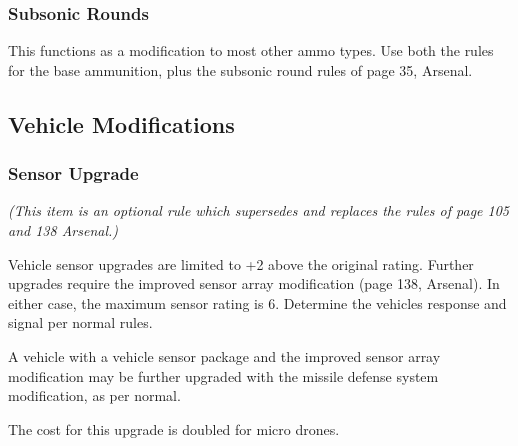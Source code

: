 \documentclass{article}
\begin{document}
\subsubsection*{Subsonic Rounds}

  This functions as a modification to most other ammo types.  Use both the rules for the base ammunition, plus the subsonic round rules of page 35, Arsenal.

\subsection*{Vehicle Modifications}

\subsubsection*{Sensor Upgrade}

\emph{(This item is an optional rule which supersedes and replaces the rules of page 105 and 138 Arsenal.)}

 Vehicle sensor upgrades are limited to +2 above the original rating. Further upgrades require the improved sensor array modification (page 138, Arsenal).  In either case, the maximum sensor rating is 6. Determine the vehicles response and signal per normal rules.

 A vehicle with a vehicle sensor package and the improved sensor array modification may be further upgraded with the missile defense system modification, as per normal.

 The cost for this upgrade is doubled for micro drones.

\onecolumn
\end{document}
